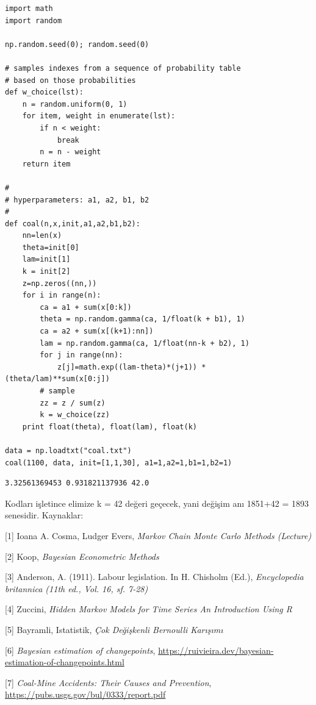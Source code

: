 \documentclass[12pt,fleqn]{article}\usepackage{../../common}
\begin{document}
\begin{verbatim}
import math
import random

np.random.seed(0); random.seed(0)

# samples indexes from a sequence of probability table
# based on those probabilities
def w_choice(lst):
    n = random.uniform(0, 1)
    for item, weight in enumerate(lst):
        if n < weight:
            break
        n = n - weight
    return item

#
# hyperparameters: a1, a2, b1, b2
#
def coal(n,x,init,a1,a2,b1,b2):
    nn=len(x)
    theta=init[0]
    lam=init[1]
    k = init[2]
    z=np.zeros((nn,))
    for i in range(n):
        ca = a1 + sum(x[0:k])
        theta = np.random.gamma(ca, 1/float(k + b1), 1) 
        ca = a2 + sum(x[(k+1):nn])
        lam = np.random.gamma(ca, 1/float(nn-k + b2), 1)
        for j in range(nn):
            z[j]=math.exp((lam-theta)*(j+1)) * (theta/lam)**sum(x[0:j])
        # sample
        zz = z / sum(z)
        k = w_choice(zz)
    print float(theta), float(lam), float(k)
                
data = np.loadtxt("coal.txt")
coal(1100, data, init=[1,1,30], a1=1,a2=1,b1=1,b2=1)
\end{verbatim}

\begin{verbatim}
3.32561369453 0.931821137936 42.0
\end{verbatim}

Kodları işletince elimize k = 42 değeri geçecek, yani değişim anı 1851+42 = 1893
senesidir. 
Kaynaklar: 

[1] Ioana A. Cosma, Ludger Evers, {\em Markov Chain Monte Carlo Methods (Lecture)}

[2] Koop, {\em Bayesian Econometric Methods}

[3] Anderson, A. (1911). Labour legislation. In H. Chisholm (Ed.),
{\em Encyclopedia britannica (11th ed., Vol. 16, sf. 7-28)}

[4] Zuccini, {\em Hidden Markov Models for Time Series An Introduction Using R}

[5] Bayramli, Istatistik, {\em Çok Değişkenli Bernoulli Karışımı}

[6] {\em Bayesian estimation of changepoints},
    \url{https://ruivieira.dev/bayesian-estimation-of-changepoints.html}

[7] {\em Coal-Mine Accidents: Their Causes and Prevention},
    \url{https://pubs.usgs.gov/bul/0333/report.pdf}
    
\end{document}
